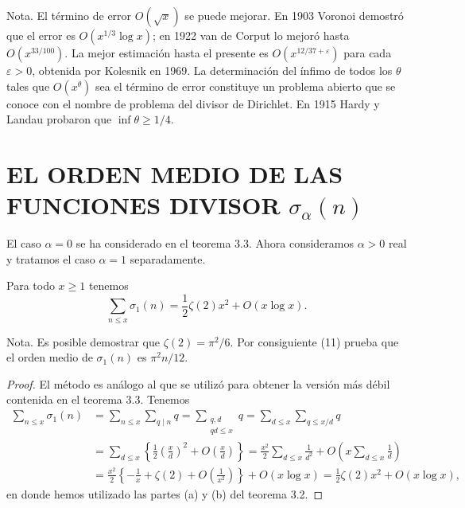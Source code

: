 \documentclass[12pt,a4paper]{book}
\begin{document}
    Nota. El término de error $O(\sqrt x)$ se puede mejorar. En 1903 Voronoi demostró que
    el error es $O(x^{1/3}\log x)$; en 1922 van de Corput lo mejoró hasta $O(x^{33/100})$.
    La mejor estimación hasta el presente es $O(x^{12/37+\varepsilon})$ para cada
    $\varepsilon>0$, obtenida por Kolesnik en 1969. La determinación del ínfimo de todos
    los $\theta$ tales que $O(x^\theta)$ sea el término de error constituye un problema
    abierto que se conoce con el nombre de problema del divisor de Dirichlet. En 1915
    Hardy y Landau probaron que $\inf\theta\geq1/4$.

    \section{EL ORDEN MEDIO DE LAS FUNCIONES DIVISOR \texorpdfstring{$\sigma_\alpha(n)$}{σα(n)}}

    El caso $\alpha=0$ se ha considerado en el teorema 3.3. Ahora consideramos $\alpha>0$
    real y tratamos el caso $\alpha=1$ separadamente.

    \begin{teorema}
        Para todo $x\geq1$ tenemos
        \begin{equation}
            \sum_{n\leq x}\sigma_1(n)=\frac{1}{2}\zeta(2)x^2+O(x\log x).
        \end{equation}
    \end{teorema}

    Nota. Es posible demostrar que $\zeta(2)=\pi^2/6$. Por consiguiente (11) prueba que el
    orden medio de $\sigma_1(n)$ es $\pi^2n/12$.

    \begin{proof}
        El método es análogo al que se utilizó para obtener la versión más débil
        contenida en el teorema 3.3. Tenemos
        \begin{align*}
            \sum_{n\leq x}\sigma_1(n)&=\sum_{n\leq x}\sum_{q\mid n}q=\sum_{\substack{q,d\\ qd\leq x}}q
            =\sum_{d\leq x}\sum_{q\leq x/d}q\\
            &=\sum_{d\leq x}\left\{\frac{1}{2}\left(\frac{x}{d}\right)^2+O\left(\frac{x}{d}\right)\right\}
            =\frac{x^2}{2}\sum_{d\leq x}\frac{1}{d^2}+O\left(x\sum_{d\leq x}\frac{1}{d}\right)\\
            &=\frac{x^2}{2}\left\{-\frac{1}{x}+\zeta(2)+O\left(\frac{1}{x^2}\right)\right\}+O(x\log x)
            =\frac{1}{2}\zeta(2)x^2+O(x\log x),
        \end{align*}
        en donde hemos utilizado las partes (a) y (b) del teorema 3.2.
    \end{proof}
\end{document}
